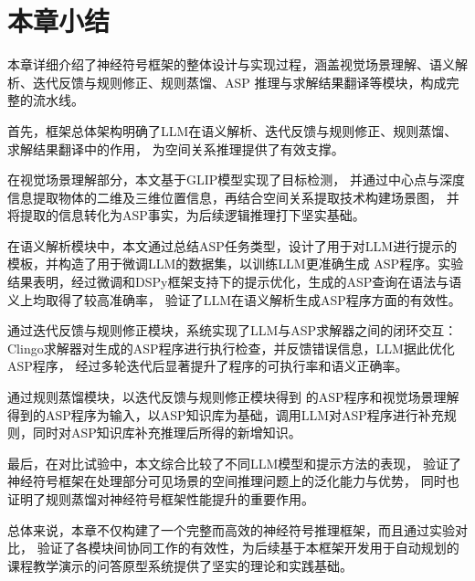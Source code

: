 \section{本章小结}
本章详细介绍了神经符号框架的整体设计与实现过程，涵盖视觉场景理解、语义解析、迭代反馈与规则修正、规则蒸馏、ASP 推理与求解结果翻译等模块，构成完整的流水线。

首先，框架总体架构明确了LLM在语义解析、迭代反馈与规则修正、规则蒸馏、求解结果翻译中的作用，
为空间关系推理提供了有效支撑。

在视觉场景理解部分，本文基于GLIP模型实现了目标检测，
并通过中心点与深度信息提取物体的二维及三维位置信息，再结合空间关系提取技术构建场景图，
并将提取的信息转化为ASP事实，为后续逻辑推理打下坚实基础。

在语义解析模块中，本文通过总结ASP任务类型，设计了用于对LLM进行提示的模板，并构造了用于微调LLM的数据集，以训练LLM更准确生成
ASP程序。实验结果表明，经过微调和DSPy框架支持下的提示优化，生成的ASP查询在语法与语义上均取得了较高准确率，
验证了LLM在语义解析生成ASP程序方面的有效性。

通过迭代反馈与规则修正模块，系统实现了LLM与ASP求解器之间的闭环交互：
Clingo求解器对生成的ASP程序进行执行检查，并反馈错误信息，LLM据此优化ASP程序，
经过多轮迭代后显著提升了程序的可执行率和语义正确率。

通过规则蒸馏模块，以迭代反馈与规则修正模块得到
的ASP程序和视觉场景理解得到的ASP程序为输入，以ASP知识库为基础，调用LLM对ASP程序进行补充规则，同时对ASP知识库补充推理后所得的新增知识。

最后，在对比试验中，本文综合比较了不同LLM模型和提示方法的表现，
验证了神经符号框架在处理部分可见场景的空间推理问题上的泛化能力与优势，
同时也证明了规则蒸馏对神经符号框架性能提升的重要作用。

总体来说，本章不仅构建了一个完整而高效的神经符号推理框架，而且通过实验对比，
验证了各模块间协同工作的有效性，为后续基于本框架开发用于自动规划的课程教学演示的问答原型系统提供了坚实的理论和实践基础。